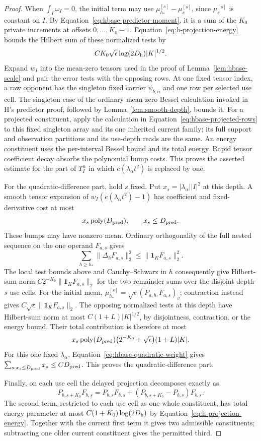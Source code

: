 \begin{proof}
When \(\int_I\omega_I=0\), the initial term may use
\(\mu_{h_*}^{[s]}-\mu_s^{[s]}\), since \(\mu_s^{[s]}\) is constant
on \(I\).  By Equation~\eqref{eq:hbase-predictor-moment}, it is a
sum of the \(K_0\) private increments at offsets \(0,\ldots,K_0-1\).
Equation~\eqref{eq:h-projection-energy} bounds the Hilbert sum of
these normalized tests by
\[
 CK_0\sqrt\epsilon\log(2D_{\rm h})|K|^{1/2}.
\]
Expand \(w_I\) into the mean-zero tensors used in the proof of
Lemma~\ref{lem:hbase-scale} and pair the error tests with the
opposing rows.  At one fixed tensor index, a raw opponent has the
singleton fixed carrier \(\psi_{b,\alpha}\) and one row per selected
use cell.  The singleton case of the ordinary mean-zero Bessel
calculation invoked in H's predictor proof, followed by
Lemma~\ref{lem:smooth-depth}, bounds it.  For a projected constituent,
apply the calculation in Equation~\eqref{eq:hbase-projected-rows}
to this fixed singleton array and its one inherited current family;
its full support and observation partitions and its use-depth reads
are the same.  An energy constituent uses the per-interval Bessel
bound and its total energy.  Rapid tensor coefficient decay absorbs
the polynomial bump costs.  This proves the asserted estimate for
the part of \(T_I^\alpha\) in which \(e(\lambda_\alpha t^2)\) is
replaced by one.

For the quadratic-difference part, hold \(s\) fixed.  Put
\(x_s=|\lambda_\alpha||I|^2\) at this depth.  A smooth tensor
expansion of \(w_I(e(\lambda_\alpha t^2)-1)\) has coefficient and
fixed-derivative cost at most
\[
 x_s\operatorname{poly}(D_{\rm pred}),\qquad x_s\le D_{\rm pred}.
\]
These bumps may have nonzero mean.  Ordinary orthogonality of the
full nested sequence on the one operand \(F_{a,s}\) gives
\[
 \sum_{h\ge h_*}\|\Delta_hF_{a,s}\|_2^2
 \le\|\mathbf1_KF_{a,s}\|_2^2.
\]
The local test bounds above and Cauchy--Schwarz in \(h\) consequently
give Hilbert-sum norm
\(C2^{-K_0}\|\mathbf1_KF_{a,s}\|_2\) for the two remainder sums
over the disjoint depth-\(s\) use cells.  For the initial mean,
\(\mu_{h_*}^{[s]}=\sqrt\epsilon(P_{a,h_*}F_{a,s})_v\);
contraction instead gives
\(C\sqrt\epsilon\|\mathbf1_KF_{a,s}\|_2\).
The opposing normalized tests at this depth have Hilbert-sum norm
at most \(C(1+L)|K|^{1/2}\), by disjointness, contraction, or the
energy bound.  Their total contribution is therefore at most
\[
 x_s\operatorname{poly}(D_{\rm pred})
       \bigl(2^{-K_0}+\sqrt\epsilon\bigr)(1+L)|K|.
\]
For this one fixed \(\lambda_\alpha\),
Equation~\eqref{eq:hbase-quadratic-weight} gives
\(\sum_{s:x_s\le D_{\rm pred}}x_s\le CD_{\rm pred}\).
This proves the quadratic-difference part.

Finally, on each use cell the delayed projection decomposes exactly as
\[
 P_{b,s+K_0}F_{b,s}
   =P_{b,s}F_{b,s}
     +(P_{b,s+K_0}-P_{b,s})F_{b,s}.
\]
The second term, restricted to each use cell as one whole constituent,
has total energy parameter at most \(C(1+K_0)\log(2D_{\rm h})\) by
Equation~\eqref{eq:h-projection-energy}.  Together with the current
first term it gives two admissible constituents; subtracting one older
current constituent gives the permitted third.
\end{proof}

